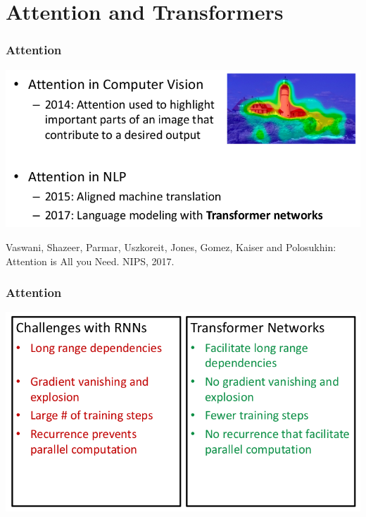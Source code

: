 \documentclass[10pt]{beamer}
\begin{document}
\iffalse

\section{Attention and Transformers} 

\begin{frame}
  \frametitle{Attention}
\begin{center}
\includegraphics[width=.9\textwidth]{images/p1}
\end{center}

\scriptsize{Vaswani, Shazeer, Parmar, Uszkoreit, Jones, Gomez, Kaiser and Polosukhin: Attention is All you Need. NIPS, 2017.}
\end{frame}


\begin{frame}
  \frametitle{Attention}
\begin{center}
\includegraphics[width=.8\textwidth]{images/p2}
\end{center}
\end{frame}
\end{document}
